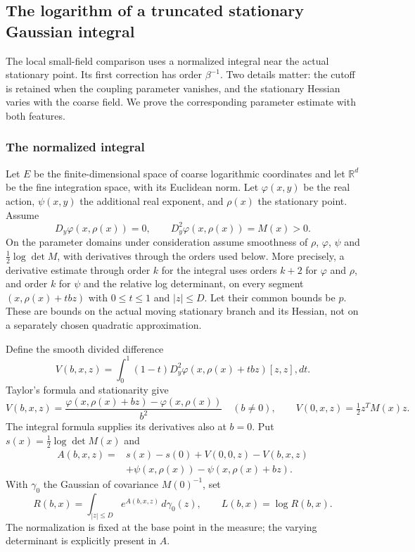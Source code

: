 \subsection{The logarithm of a truncated stationary Gaussian integral}
\label{sec:truncated-stationary-log}
The local small-field comparison uses a normalized integral near the
actual stationary point. Its first correction has order $\beta^{-1}$.
Two details matter: the cutoff is retained when the coupling parameter
vanishes, and the stationary Hessian varies with the coarse field.
We prove the corresponding parameter estimate with both features.

\subsubsection{The normalized integral}
Let $E$ be the finite-dimensional space of coarse logarithmic
coordinates and let $\mathbb R^d$ be the fine integration space, with
its Euclidean norm. Let $\varphi(x,y)$ be the real action,
$\psi(x,y)$ the additional real exponent, and $\rho(x)$ the stationary
point. Assume
\[
 D_y\varphi(x,\rho(x))=0,\qquad
                   D_y^2\varphi(x,\rho(x))=M(x)>0.
\]
On the parameter domains under consideration assume smoothness of
$\rho$, $\varphi$, $\psi$ and $\tfrac12\log\det M$, with derivatives
through the orders used below. More precisely, a derivative estimate
through order $k$ for the integral uses orders $k+2$ for $\varphi$
and $\rho$, and order $k$ for $\psi$ and the relative log determinant,
on every segment $(x,\rho(x)+tbz)$ with $0\le t\le1$ and $|z|\le D$.
Let their common bounds be $p$. These are bounds on the actual moving
stationary branch and its Hessian, not on a separately chosen quadratic
approximation.

Define the smooth divided difference
\[
 V(b,x,z)=\int_0^1(1-t)
   D_y^2\varphi(x,\rho(x)+tbz)[z,z],dt.
\]
Taylor's formula and stationarity give
\[
 V(b,x,z)=\frac{\varphi(x,\rho(x)+bz)-\varphi(x,\rho(x))}{b^2}
 \quad(b\ne0),\qquad V(0,x,z)=\tfrac12z^TM(x)z.
\]
The integral formula supplies its derivatives also at $b=0$.
Put $s(x)=\tfrac12\log\det M(x)$ and
\begin{align*}
 A(b,x,z)={}&s(x)-s(0)+V(0,0,z)-V(b,x,z)\\
            &+\psi(x,\rho(x))-\psi(x,\rho(x)+bz).
\end{align*}
With $\gamma_0$ the Gaussian of covariance $M(0)^{-1}$, set
\begin{equation}\label{eq:stationary-normalized-integral}
 R(b,x)=\int_{|z|\le D}e^{A(b,x,z)}\,d\gamma_0(z),
                         \qquad L(b,x)=\log R(b,x).
\end{equation}
The normalization is fixed at the base point in the measure; the
varying determinant is explicitly present in $A$.


